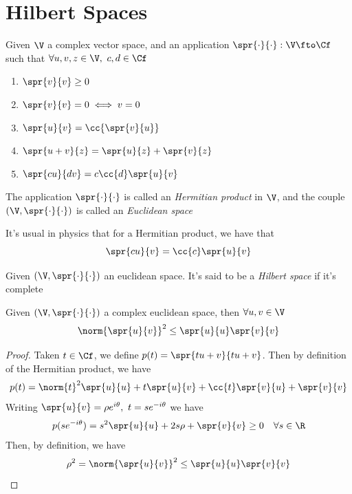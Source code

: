 \documentclass[../mmf.tex]{subfiles}
\begin{document}
\section{Hilbert Spaces}
\begin{dfn}
	Given $\V$ a complex vector space, and an application $\spr{\cdot}{\cdot}:\V\fto\Cf$ such that $\forall u,v,z\in\V,\ c,d\in\Cf$
	\begin{enumerate}
	\item $\spr{v}{v}\ge0$
	\item $\spr{v}{v}=0\iff v=0$
	\item $\spr{u}{v}=\cc{\spr{v}{u}}$
	\item $\spr{u+v}{z}=\spr{u}{z}+\spr{v}{z}$
	\item $\spr{cu}{dv}=c\cc{d}\spr{u}{v}$
	\end{enumerate}
	The application $\spr{\cdot}{\cdot}$ is called an \textit{Hermitian product} in $\V$, and the couple $(\V,\spr{\cdot}{\cdot})$ is called an \textit{Euclidean space}
\end{dfn}
\begin{rmk}
	It's usual in physics that for a Hermitian product, we have that
	\begin{equation}
		\spr{cu}{v}=\cc{c}\spr{u}{v}
		\label{eq:physicshermprod}
	\end{equation}
\end{rmk}
\begin{dfn}
	Given $(\V,\spr{\cdot}{\cdot})$ an euclidean space. It's said to be a \textit{Hilbert space} if it's complete
\end{dfn}
\begin{thm}
	Given $(\V,\spr{\cdot}{\cdot})$ a complex euclidean space, then $\forall u,v\in\V$
	\begin{equation}
		\norm{\spr{u}{v}}^2\le\spr{u}{u}\spr{v}{v}
		\label{eq:cauchyschwartzineq}
	\end{equation}
\end{thm}
\begin{proof}
	Taken $t\in\Cf$, we define $p(t)=\spr{tu+v}{tu+v}$. Then by definition of the Hermitian product, we have
	\begin{equation*}
		p(t)=\norm{t}^2\spr{u}{u}+t\spr{u}{v}+\cc{t}\spr{v}{u}+\spr{v}{v}
	\end{equation*}
	Writing $\spr{u}{v}=\rho e^{i\theta},\ t=se^{-i\theta}$ we have
	\begin{equation*}
		p(se^{-i\theta})=s^2\spr{u}{u}+2s\rho+\spr{v}{v}\ge0\quad\forall s\in\R
	\end{equation*}
	Then, by definition, we have
	\begin{equation*}
		\rho^2=\norm{\spr{u}{v}}^2\le\spr{u}{u}\spr{v}{v}
	\end{equation*}
\end{proof}
\end{document}
